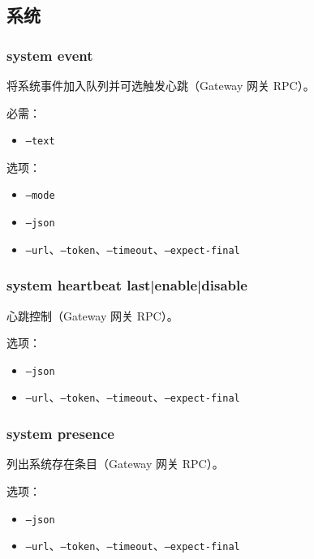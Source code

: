 \subsection{系统}


\subsubsection{system event}


将系统事件加入队列并可选触发心跳（Gateway 网关 RPC）。

必需：

\begin{itemize}
  \item \texttt{--text }
\end{itemize}


选项：

\begin{itemize}
  \item \texttt{--mode }
  \item \texttt{--json}
  \item \texttt{--url}、\texttt{--token}、\texttt{--timeout}、\texttt{--expect-final}
\end{itemize}


\subsubsection{system heartbeat last|enable|disable}


心跳控制（Gateway 网关 RPC）。

选项：

\begin{itemize}
  \item \texttt{--json}
  \item \texttt{--url}、\texttt{--token}、\texttt{--timeout}、\texttt{--expect-final}
\end{itemize}


\subsubsection{system presence}


列出系统存在条目（Gateway 网关 RPC）。

选项：

\begin{itemize}
  \item \texttt{--json}
  \item \texttt{--url}、\texttt{--token}、\texttt{--timeout}、\texttt{--expect-final}
\end{itemize}


